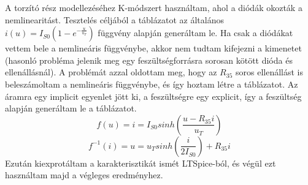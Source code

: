 A torzító rész modellezéséhez K-módszert használtam, ahol a diódák okozták a nemlinearitást. Tesztelés céljából a táblázatot az általános $i(u)=I_{S0}(1-e^{-\frac{u}{u_T}})$ függvény alapján generáltam le. Ha csak a diódákat vettem bele a nemlineáris függvénybe, akkor nem tudtam kifejezni a kimenetet (hasonló probléma jelenik meg egy feszültségforrásra sorosan kötött dióda és ellenállásnál). A problémát azzal oldottam meg, hogy az $R_{35}$ soros ellenállást is beleszámoltam a nemlineáris függvénybe, és így hoztam létre a táblázatot. Az áramra egy implicit egyenlet jött ki, a feszültségre egy explicit, így a feszültség alapján generáltam le a táblázatot.
\pagebreak
\begin{equation}
    f(u)=i=I_{S0}sinh(\frac{u-R_{35}i}{u_T})
\end{equation}
\begin{equation}
    f^{-1}(i)=u=u_Tsinh(\frac{i}{2I_{S0}})+R_{35}i
\end{equation}
Ezután kiexprotáltam a karakterisztikát ismét LTSpice-ból, és végül ezt használtam majd a végleges eredményhez.

